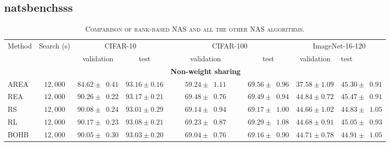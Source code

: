 \documentclass[sigconf]{acmart}
\begin{document}
    \subsection*{natsbenchsss}
    \begin{table*}[htb]
        \newcommand{\z}{\phantom{0}}
        \caption{\textsc{Comparison of rank-based NAS and all the other NAS algorithms.}}
          \vspace{-\baselineskip}
        \begin{tabular}{@{}lccccccl@{}}\toprule
        Method & Search (s) & \multicolumn{2}{c}{CIFAR-10} & \multicolumn{2}{c}{CIFAR-100} & \multicolumn{2}{c}{ImageNet-16-120} \\ \cmidrule(lr){3-4}\cmidrule(lr){5-6}\cmidrule(lr){7-8}
        & & validation & test & validation & test & validation & test \\ \midrule
        &&&&\textbf{Non-weight sharing}&&&\\
        AREA      & $12,000$ & $84.62 \pm \z{0.41}$                & $93.16 \pm 0.16$               & $59.24 \pm \z{1.11}$                 & $69.56 \pm \z{0.96}$                & $37.58 \pm 1.09$                 & $45.30 \pm \z{0.91}$                \\
        REA       & $12,000$ & $90.26 \pm \z{0.22}$                & $93.17 \pm 0.21$               & $69.48 \pm \z{0.76}$                 & $69.49 \pm \z{0.94}$                & $44.84 \pm 0.72$                 & $45.47 \pm \z{0.91}$                \\
        RS        & $12,000$ & $90.08 \pm \z{0.24}$                & $93.01 \pm 0.29$               & $69.14 \pm \z{0.94}$                 & $69.17 \pm \z{1.00}$                & $44.66 \pm 1.02$                 & $44.83 \pm \z{1.05}$                \\
        RL        & $12,000$ & $90.17 \pm \z{0.23}$                & $93.08 \pm 0.21$               & $69.23 \pm \z{0.87}$                 & $69.29 \pm \z{1.08}$                & $44.68 \pm 0.91$                 & $45.05 \pm \z{0.93}$                \\
        BOHB      & $12,000$ & $90.05 \pm \z{0.30}$                & $93.03 \pm 0.20$               & $69.04 \pm \z{0.76}$                 & $69.16 \pm \z{0.90}$                & $44.71 \pm 0.78$                 & $44.91 \pm \z{1.05}$                \\ \midrule

\end{tabular}
\end{table*}
\end{document}
